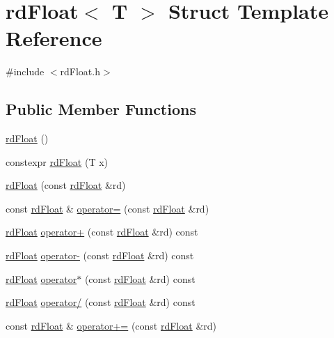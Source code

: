 \hypertarget{structrd_float}{}\section{rd\+Float$<$ T $>$ Struct Template Reference}
\label{structrd_float}


{\ttfamily \#include $<$rd\+Float.\+h$>$}

\subsection*{Public Member Functions}
\begin{DoxyCompactItemize}
\item 
\mbox{\hyperlink{structrd_float_a3e4fbd41fa0ae882c9f98ec87fc2afde}{rd\+Float}} ()
\item 
constexpr \mbox{\hyperlink{structrd_float_afc0602174b6294eebf149f85dc89b735}{rd\+Float}} (T x)
\item 
\mbox{\hyperlink{structrd_float_ac0bf1cf37b77c7b5440201ec438e668c}{rd\+Float}} (const \mbox{\hyperlink{structrd_float}{rd\+Float}} \&rd)
\item 
const \mbox{\hyperlink{structrd_float}{rd\+Float}} \& \mbox{\hyperlink{structrd_float_a54f393fb7816d8b1b834e9cf26524787}{operator=}} (const \mbox{\hyperlink{structrd_float}{rd\+Float}} \&rd)
\item 
\mbox{\hyperlink{structrd_float}{rd\+Float}} \mbox{\hyperlink{structrd_float_af07b27de8e50f1b671ff7da8d5cc1bfe}{operator+}} (const \mbox{\hyperlink{structrd_float}{rd\+Float}} \&rd) const
\item 
\mbox{\hyperlink{structrd_float}{rd\+Float}} \mbox{\hyperlink{structrd_float_a93cac969ebddfb3a283beca812bd3439}{operator-\/}} (const \mbox{\hyperlink{structrd_float}{rd\+Float}} \&rd) const
\item 
\mbox{\hyperlink{structrd_float}{rd\+Float}} \mbox{\hyperlink{structrd_float_a95b7a406601f9f1e146a52acf7f862ae}{operator$\ast$}} (const \mbox{\hyperlink{structrd_float}{rd\+Float}} \&rd) const
\item 
\mbox{\hyperlink{structrd_float}{rd\+Float}} \mbox{\hyperlink{structrd_float_a626fd2b5329cc471496f2d43abba0eaf}{operator/}} (const \mbox{\hyperlink{structrd_float}{rd\+Float}} \&rd) const
\item 
const \mbox{\hyperlink{structrd_float}{rd\+Float}} \& \mbox{\hyperlink{structrd_float_a042dec8fcad27a109288ea14266c5d0e}{operator+=}} (const \mbox{\hyperlink{structrd_float}{rd\+Float}} \&rd)
\item 

\end{DoxyCompactItemize}
